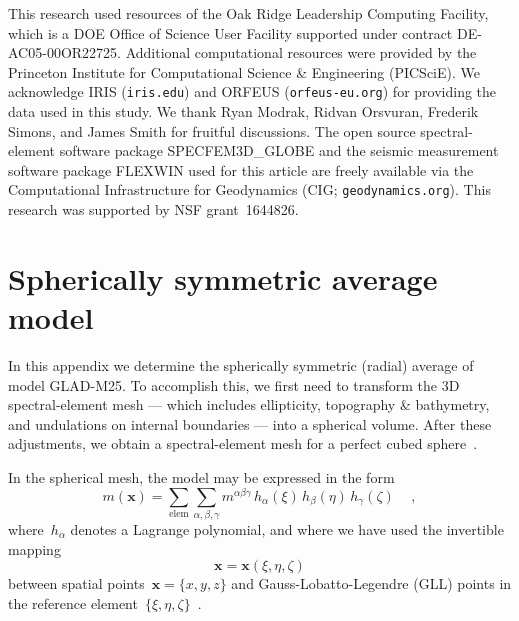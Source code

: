 \documentclass[extra,mreferee]{gji}
\begin{document}
\begin{acknowledgments}

This research used resources of the Oak Ridge Leadership Computing Facility,
which is a DOE Office of Science User Facility supported under contract DE-AC05-00OR22725.
Additional computational resources were provided by the Princeton Institute
for Computational Science \& Engineering (PICSciE).
We acknowledge IRIS ({\tt iris.edu}) and ORFEUS ({\tt orfeus-eu.org}) for
providing the data used in this study.
We thank Ryan Modrak, Ridvan Orsvuran, Frederik Simons, and James Smith for fruitful discussions.
The open source spectral-element software package SPECFEM3D\_GLOBE and
the seismic measurement software package FLEXWIN used for this article are
 freely available via the Computational Infrastructure for Geodynamics
 (CIG; {\tt geodynamics.org}). This research was supported by NSF grant~1644826.

\end{acknowledgments}

\newpage

\appendix

\section{Spherically symmetric average model}
\label{sec:1Dmodel}

In this appendix we determine the spherically symmetric (radial) average of model GLAD-M25.
To accomplish this,
we first need to transform the 3D spectral-element mesh --- which includes ellipticity, topography \& bathymetry, and undulations on internal boundaries --- into a spherical volume.
After these adjustments, we obtain a spectral-element mesh for a perfect cubed sphere~\citep{KoTr02a}.

In the spherical mesh, the model may be expressed in the form
\begin{equation}
    m(\mathbf{x})=\sum_{\mathrm{elem}}\sum_{\alpha,\beta,\gamma}m^{\alpha\beta\gamma}\,h_{\alpha}(\xi)\,h_{\beta}(\eta)\,h_{\gamma}(\zeta)\,
    \quad ,
\end{equation}
where~$h_\alpha$ denotes a Lagrange polynomial, and where we have used the invertible mapping
\begin{equation}
    \mathbf{x}=\mathbf{x}(\xi,\eta,\zeta)
\end{equation}
between spatial points~$\mathbf{x}=\{x,y,z\}$ and Gauss-Lobatto-Legendre (GLL) points in the reference element~$\{\xi,\eta,\zeta\}$~\citep{KoTr99}.
\end{document}
